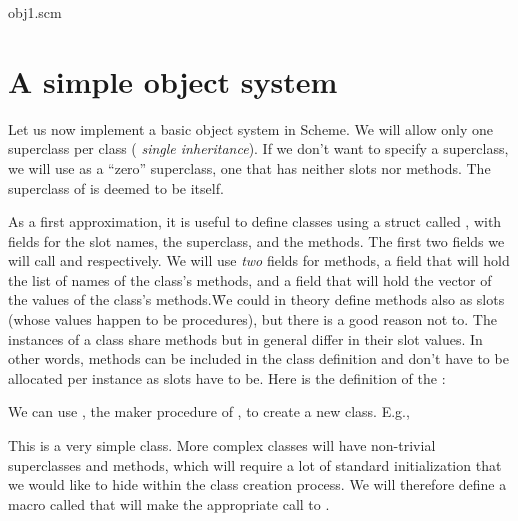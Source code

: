 \scmfilename obj1.scm


\section{A simple object system}

Let us now implement a basic object system in Scheme.
We will allow only one superclass per class ({\em
single inheritance}).  If we don’t want to specify a
superclass, we will use  as a “zero”
superclass, one that has neither slots nor methods.
The superclass of  is deemed to be itself.

As a first approximation, it is useful to define
classes using a struct called , with
fields for the slot names, the superclass, and the
methods.  The first two fields we will call 
and  respectively.  We will use {\em two}
fields for methods, a
 field that will hold the list of names
of the class’s methods, and a
 field that will hold the vector of
the values of the class’s methods.\f{We could in theory
define methods also as slots (whose values happen to be
procedures), but there is a good reason not to.  The
instances of a class share methods but in general
differ in their slot values.  In other words, methods
can be included in the class definition and don’t have
to be allocated per instance as slots have to be.}
Here is the definition of the :


\n We can use , the maker procedure of
, to create a new class.  E.g.,


\n This is a very simple class.   More complex classes
will have non-trivial superclasses and methods, which
will require a lot of standard initialization that we
would like to hide within the class creation process.
We will therefore define a macro called
 that will make the appropriate call to
.


